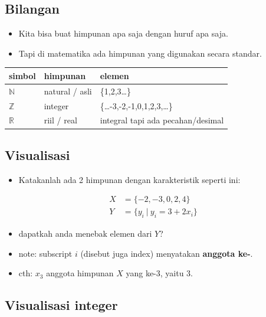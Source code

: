 \documentclass[
  letterpaper,
  DIV=11,
  numbers=noendperiod]{scrartcl}
\providecommand{\tightlist}{%
  \setlength{\itemsep}{0pt}\setlength{\parskip}{0pt}}\usepackage{longtable,booktabs,array}
\begin{document}
\hypertarget{bilangan}{%
\subsection{Bilangan}\label{bilangan}}

\begin{itemize}
\item
  Kita bisa buat himpunan apa saja dengan huruf apa saja.
\item
  Tapi di matematika ada himpunan yang digunakan secara standar.
\end{itemize}

\begin{longtable}[]{@{}lll@{}}
\toprule\noalign{}
simbol & himpunan & elemen \\
\midrule\noalign{}
\endhead
\bottomrule\noalign{}
\endlastfoot
\(\mathbb{N}\) & natural / asli & \{1,2,3\ldots\} \\
\(\mathbb{Z}\) & integer & \{\ldots-3,-2,-1,0,1,2,3,\ldots\} \\
\(\mathbb{R}\) & riil / real & integral tapi ada pecahan/desimal \\
\end{longtable}

\hypertarget{visualisasi-2}{%
\subsection{Visualisasi}\label{visualisasi-2}}

\begin{itemize}
\tightlist
\item
  Katakanlah ada 2 himpunan dengan karakteristik seperti ini:
\end{itemize}

\[
\begin{align}
X&=\{-2,-3,0,2,4\} \\
Y&=\{y_i \ |\  y_i=3+2x_i\}
\end{align}
\]

\begin{itemize}
\item
  dapatkah anda menebak elemen dari \(Y\)?
\item
  note: subscript \(i\) (disebut juga index) menyatakan \textbf{anggota
  ke-}.
\item
  cth: \(x_3\) anggota himpunan \(X\) yang ke-3, yaitu 3.
\end{itemize}

\hypertarget{visualisasi-integer}{%
\subsection{Visualisasi integer}\label{visualisasi-integer}}
\end{document}
